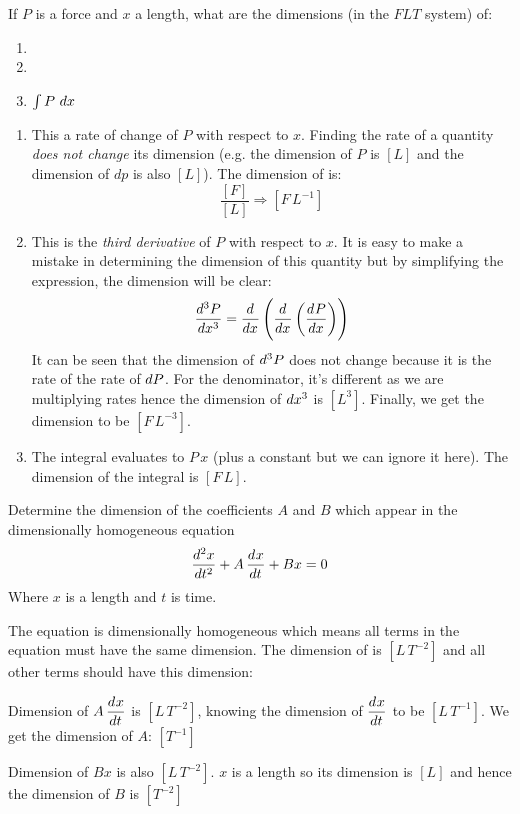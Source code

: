 \begin{question}
  If $P$ is a force and $x$ a length, what are the dimensions (in the
  $FLT$ system) of:
  \begin{enumerate}[label=\alph*)]
  \item {}
  \item {}
  \item $\int P\,\mathop{}\!d x$
  \end{enumerate}
\end{question}
\begin{solution}
  \begin{enumerate}[label=\alph*)]
  \item This a rate of change of $P$ with respect to $x$. Finding
    the rate of a quantity \emph{does not change} its dimension
    (e.g. the dimension of $P$ is $[L]$ and the dimension of $dp$ is
    also $[L]$). The dimension of  is:
    \begin{equation*}
      \frac{[F]}{[L]} \Rightarrow [F\,L^{-1}]
    \end{equation*}
  \item This is the \emph{third derivative} of $P$ with respect to
    $x$. It is easy to make a mistake in determining the dimension of
    this quantity but by simplifying the expression, the dimension
    will be clear:
    \begin{equation*}
      \dod[3]{P}{x} = \dod{}{x}\left(\dod{}{x}\left(\dod{P}{x}\right)\right)
    \end{equation*}
    It can be seen that the dimension of $\mathop{}\!d^3P$ does not change
    because it is the rate of the rate of $\mathop{}\!d P$. For the denominator,
    it's different as we are multiplying rates hence the dimension of
    $\mathop{}\!d x^3$ is $[L^3]$. Finally, we get the dimension to be $[F\,L^{-3}]$.
  \item The integral evaluates to $P\,x$ (plus a constant but we can
    ignore it here). The dimension of the integral is $[F\,L]$.
  \end{enumerate}
\end{solution}


\begin{question}
  Determine the dimension of the coefficients $A$ and $B$ which appear
  in the dimensionally homogeneous equation
  \begin{equation*}
    \dod[2]{x}{t} + A\dod{x}{t} + Bx = 0
  \end{equation*}
  Where $x$ is a length and $t$ is time.
\end{question}
\begin{solution}
  The equation is dimensionally homogeneous which means all terms in
  the equation must have the same dimension. The dimension of
   is $[L\,T^{-2}]$ and all other terms should have
  this dimension:

  Dimension of $A\dod{x}{t}$ is $[L\,T^{-2}]$, knowing the dimension
  of $\dod{x}{t}$ to be $[L\,T^{-1}]$. We get the dimension of $A$:
  $[T^{-1}]$

  Dimension of $Bx$ is also $[L\,T^{-2}]$. $x$ is a length so its
  dimension is $[L]$ and hence the dimension of $B$ is $[T^{-2}]$
\end{solution}

